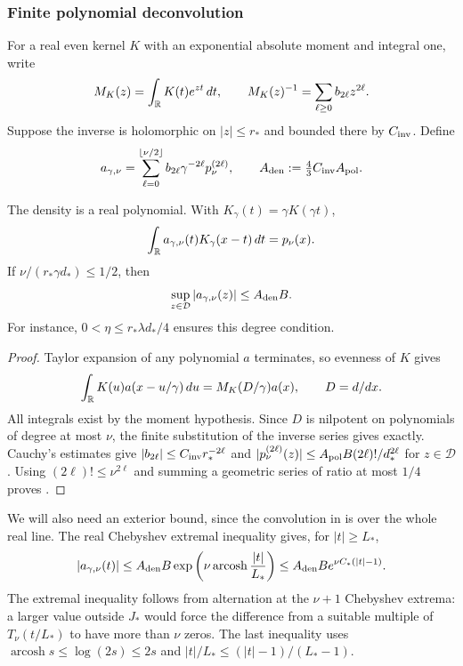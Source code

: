 \subsubsection{Finite polynomial deconvolution}
For a real even kernel $K$ with an exponential absolute moment and integral one,
write
\begin{equation}
 M_K(z)=\int_\mathbb R K(t)e^{zt}\,dt,\qquad
 M_K(z)^{-1}=\sum_{\ell\ge0}b_{2\ell}z^{2\ell}.
 \label{eq:psi-mgf}
\end{equation}
Suppose the inverse is holomorphic on $|z|\le r_*$ and bounded there by
$C_{\rm inv}$. Define
\begin{equation}
 a_{\gamma,\nu}
 =\sum_{\ell=0}^{\lfloor\nu/2\rfloor}
 b_{2\ell}\gamma^{-2\ell}p_\nu^{(2\ell)},\qquad
 A_{\rm den}:=\tfrac43 C_{\rm inv}A_{\rm pol}.
 \label{eq:psi-deconv}
\end{equation}

\begin{lemma}
\label{lem:psi-deconv}\label{lem:psi-density}
The density is a real polynomial. With $K_\gamma(t)=\gamma K(\gamma t)$,
\begin{equation}
 \int_\mathbb R a_{\gamma,\nu}(t)K_\gamma(x-t)\,dt=p_\nu(x).
 \label{eq:psi-exact-convolution}
\end{equation}
If $\nu/(r_*\gamma d_*)\le1/2$, then
\begin{equation}
 \sup_{z\in\mathcal D}|a_{\gamma,\nu}(z)|\le A_{\rm den}B.
 \label{eq:psi-density-bound}
\end{equation}
For instance, $0<\eta\le r_*\lambda d_*/4$ ensures this degree condition.
\end{lemma}
\begin{proof}
Taylor expansion of any polynomial $a$ terminates, so evenness of $K$ gives
\[
 \int_\mathbb R K(u)a(x-u/\gamma)\,du=M_K(D/\gamma)a(x),\qquad D=d/dx.
\]
All integrals exist by the moment hypothesis. Since $D$ is nilpotent on
polynomials of degree at most $\nu$, the finite substitution of the inverse
series gives  exactly.
Cauchy's estimates give $|b_{2\ell}|\le C_{\rm inv}r_*^{-2\ell}$ and
$|p_\nu^{(2\ell)}(z)|\le A_{\rm pol}B(2\ell)!/d_*^{2\ell}$ for
$z\in\mathcal D$. Using $(2\ell)!\le\nu^{2\ell}$ and summing a geometric
series of ratio at most $1/4$ proves .
\end{proof}
We will also need an exterior bound, since the convolution in
 is over the whole real line. The real
Chebyshev extremal inequality gives, for $|t|\ge L_*$,
\begin{equation}
 |a_{\gamma,\nu}(t)|
 \le A_{\rm den}B\exp\left(\nu\operatorname{arcosh}\frac{|t|}{L_*}\right)
 \le A_{\rm den}B e^{\nu C_*(|t|-1)}.
 \label{eq:psi-exterior}
\end{equation}
The extremal inequality follows from alternation at the $\nu+1$ Chebyshev
extrema: a larger value outside $J_*$ would force the difference from a
suitable multiple of $T_\nu(t/L_*)$ to have more than $\nu$ zeros.
The last inequality uses $\operatorname{arcosh}s\le\log(2s)\le2s$ and
$|t|/L_*\le(|t|-1)/(L_*-1)$.


